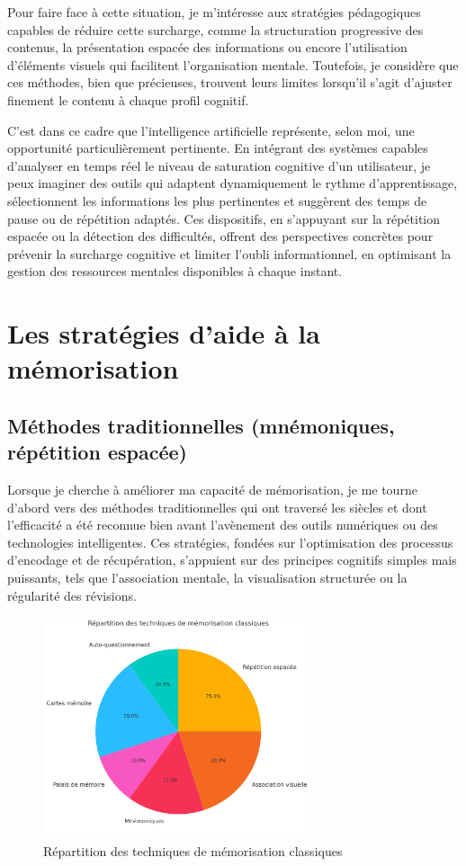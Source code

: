 \documentclass[11pt,a4paper]{report}
\begin{document}
Pour faire face à cette situation, je m’intéresse aux stratégies pédagogiques capables de réduire cette surcharge, comme la structuration progressive des contenus, la présentation espacée des informations ou encore l’utilisation d’éléments visuels qui facilitent l’organisation mentale. Toutefois, je considère que ces méthodes, bien que précieuses, trouvent leurs limites lorsqu’il s’agit d’ajuster finement le contenu à chaque profil cognitif.

C’est dans ce cadre que l’intelligence artificielle représente, selon moi, une opportunité particulièrement pertinente. En intégrant des systèmes capables d’analyser en temps réel le niveau de saturation cognitive d’un utilisateur, je peux imaginer des outils qui adaptent dynamiquement le rythme d’apprentissage, sélectionnent les informations les plus pertinentes et suggèrent des temps de pause ou de répétition adaptés. Ces dispositifs, en s’appuyant sur la répétition espacée ou la détection des difficultés, offrent des perspectives concrètes pour prévenir la surcharge cognitive et limiter l’oubli informationnel, en optimisant la gestion des ressources mentales disponibles à chaque instant.

\section{Les stratégies d’aide à la mémorisation}

\subsection{Méthodes traditionnelles (mnémoniques, répétition espacée)}

Lorsque je cherche à améliorer ma capacité de mémorisation, je me tourne d’abord vers des méthodes traditionnelles qui ont traversé les siècles et dont l’efficacité a été reconnue bien avant l’avènement des outils numériques ou des technologies intelligentes. Ces stratégies, fondées sur l’optimisation des processus d’encodage et de récupération, s’appuient sur des principes cognitifs simples mais puissants, tels que l’association mentale, la visualisation structurée ou la régularité des révisions.

\begin{figure}[h]
    \centering
    \includegraphics[width=0.7\textwidth]{images/1.3.1.png}
    \caption{Répartition des techniques de mémorisation classiques}
    \label{fig:1.3.1}
\end{figure}
\end{document}
